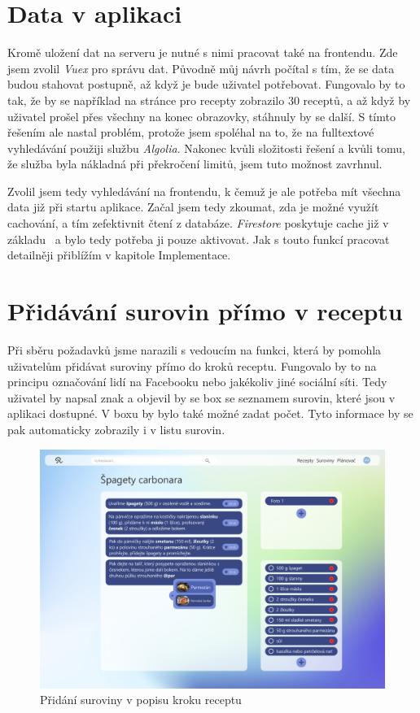 \section{Data v aplikaci}
Kromě uložení dat na serveru je nutné s nimi pracovat také na frontendu. Zde jsem zvolil \emph{Vuex} pro správu dat. Původně
můj návrh počítal s tím, že se data budou stahovat postupně, až když je bude uživatel potřebovat. Fungovalo by to tak, že by
se například na stránce pro recepty zobrazilo 30 receptů, a až když by uživatel prošel přes všechny na konec obrazovky, stáhnuly
by se další. S tímto řešením ale nastal problém, protože jsem spoléhal na to, že na fulltextové vyhledávání použiji službu
\emph{Algolia}. Nakonec kvůli složitosti řešení a kvůli tomu, že služba byla nákladná při překročení limitů, jsem tuto možnost zavrhnul.

Zvolil jsem tedy vyhledávání na frontendu, k čemuž je ale potřeba mít všechna data již při startu aplikace. Začal jsem tedy
zkoumat, zda je možné využít cachování, a tím zefektivnit čtení z databáze. \emph{Firestore} poskytuje cache již v základu~\cite{FirestoreCache} a bylo
tedy potřeba ji pouze aktivovat. Jak s touto funkcí pracovat detailněji přiblížím v kapitole Implementace.

\section{Přidávání surovin přímo v receptu}
Při sběru požadavků jsme narazili s vedoucím na funkci, která by pomohla uživatelům přidávat suroviny přímo do kroků receptu.
Fungovalo by to na principu označování lidí na Facebooku nebo jakékoliv jiné sociální síti. Tedy uživatel by napsal znak 
a objevil by se box se seznamem surovin, které jsou v aplikaci dostupné. V boxu by bylo také možné zadat počet. Tyto informace
by se pak automaticky zobrazily i v listu surovin.

\begin{figure}[H]
    \includegraphics[width=\textwidth]{pdf/adobexd/suroviny-v-textu}
    \caption{Přidání suroviny v popisu kroku receptu} \label{picture:recipeo:suroviny-v-textu}
\end{figure}
